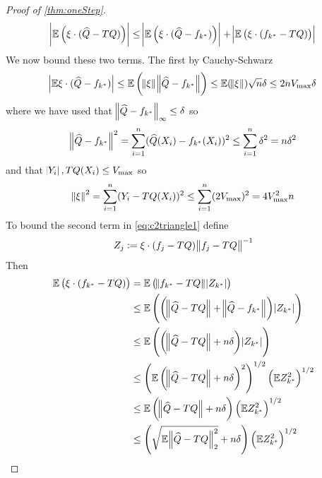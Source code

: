 \begin{proof}[Proof of \cref{thm:oneStep}]
  \begin{equation}
    \abs{\mathbb{E} \left( \xi \cdot (\widehat{Q} - TQ) \right) }
    \leq \abs{\mathbb{E} \left( \xi \cdot (\widehat{Q} - f_{k^*}) \right) } 
    + \abs{\mathbb{E} \left( \xi \cdot (f_{k^*} - TQ) \right) }
    \label{eq:c2triangle1}
  \end{equation}
  We now bound these two terms. The first by Cauchy-Schwarz
  \begin{equation}
    \abs{\mathbb{E} \xi \cdot (\widehat{Q} - f_{k^*})}
    \leq \mathbb{E} \left( \norm{\xi} \norm{\widehat{Q} - f_{k^*}} \right)
    \leq \mathbb{E} (\norm{\xi}) \sqrt{n} \delta
    \leq 2 n V_{\max} \delta
    \label{eq:c2firstcs}
  \end{equation}
  where we have used that $\norm{\widehat{Q} - f_{k^*}}_\infty \leq \delta$ so
  \begin{equation}
    \norm{\widehat{Q} - f_{k^*}}^2
    = \sum_{i=1}^n (\widehat{Q}(X_i) - f_{k^*}(X_i))^2
    \leq \sum_{i=1}^n \delta^2
    = n \delta^2
  \end{equation}
  and that $\abs{Y_i}, TQ(X_i) \leq V_{\max}$ so
  \begin{equation}
    \norm{\xi}^2 = \sum_{i=1}^n (Y_i - TQ(X_i))^2 
    \leq \sum_{i=1}^n (2 V_{\max})^2
    = 4 V_{\max}^2 n
  \end{equation}
  To bound the second term in \cref{eq:c2triangle1} define
  \begin{equation}
  Z_j := \xi \cdot (f_j - TQ) \norm{f_j - TQ}^{-1}
  \end{equation}
  Then
  \begin{align}
    \E \left( \xi \cdot (f_{k^*} - TQ) \right)
    &= \E \left( \norm{f_{k^*} - TQ} \abs{Z_{k^*}} \right)
    \label{eq:long1_1}
    \\ &\leq 
    \E \left( \left(\norm{\wh{Q} - TQ} + \norm{\wh{Q} - f_{k^*}} \right)
    \abs{Z_{k^*}} \right) 
    \label{eq:long1_2}
    \\ &\leq 
    \E \left( \left(\norm{\wh{Q} - TQ} + n \delta \right)
    \abs{Z_{k^*}} \right) 
    \label{eq:long1_3}
    \\ &\leq 
    \left( \E \left(\norm{\wh{Q} - TQ} + n \delta \right)^2 \right)^{1/2}
    \left( \E Z_{k^*}^2 \right)^{1/2} 
    \label{eq:long1_4}
    \\ &\leq 
    \E \left(\norm{\wh{Q} - TQ} + n \delta \right) 
    \left( \E Z_{k^*}^2 \right)^{1/2} 
    \label{eq:long1_5}
    \\ &\leq 
    \left(\sqrt{ \E \norm{\wh{Q} -TQ}_2^2 } + n \delta \right) 
    \left( \E Z_{k^*}^2 \right)^{1/2} 
    \label{eq:long1_6}

\end{align}
\end{proof}
